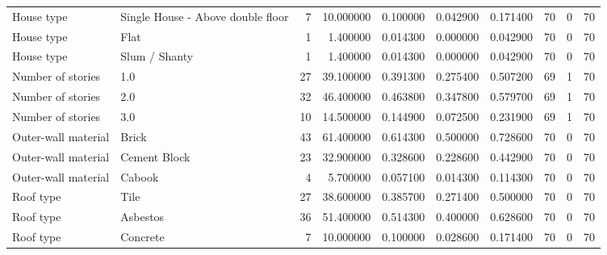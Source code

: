 \begin{table}
\begin{tabular}{llrrrrrrrr}
House type & Single House - Above double floor & 7 & 10.000000 & 0.100000 & 0.042900 & 0.171400 & 70 & 0 & 70 \\
House type & Flat & 1 & 1.400000 & 0.014300 & 0.000000 & 0.042900 & 70 & 0 & 70 \\
House type & Slum / Shanty & 1 & 1.400000 & 0.014300 & 0.000000 & 0.042900 & 70 & 0 & 70 \\
Number of stories & 1.0 & 27 & 39.100000 & 0.391300 & 0.275400 & 0.507200 & 69 & 1 & 70 \\
Number of stories & 2.0 & 32 & 46.400000 & 0.463800 & 0.347800 & 0.579700 & 69 & 1 & 70 \\
Number of stories & 3.0 & 10 & 14.500000 & 0.144900 & 0.072500 & 0.231900 & 69 & 1 & 70 \\
Outer-wall material & Brick & 43 & 61.400000 & 0.614300 & 0.500000 & 0.728600 & 70 & 0 & 70 \\
Outer-wall material & Cement Block & 23 & 32.900000 & 0.328600 & 0.228600 & 0.442900 & 70 & 0 & 70 \\
Outer-wall material & Cabook & 4 & 5.700000 & 0.057100 & 0.014300 & 0.114300 & 70 & 0 & 70 \\
Roof type & Tile & 27 & 38.600000 & 0.385700 & 0.271400 & 0.500000 & 70 & 0 & 70 \\
Roof type & Asbestos & 36 & 51.400000 & 0.514300 & 0.400000 & 0.628600 & 70 & 0 & 70 \\
Roof type & Concrete & 7 & 10.000000 & 0.100000 & 0.028600 & 0.171400 & 70 & 0 & 70 \\
\bottomrule
\end{tabular}
\end{table}
